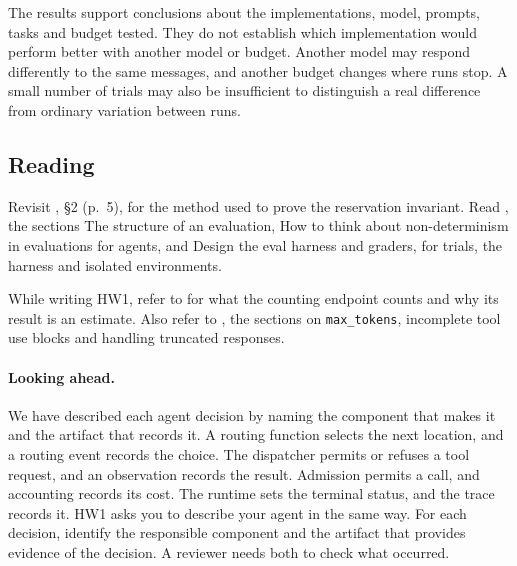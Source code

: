 The results support conclusions about the implementations, model, prompts, tasks and budget
tested. They do not establish which implementation would perform better with another model or
budget. Another model may respond differently to the same messages, and another budget changes
where runs stop. A small number of trials may also be insufficient to distinguish a real
difference from ordinary variation between runs.

\subsection{Reading}

Revisit \citet{mit6042-lec16}, \S2 (p.~5), for the method used to prove the reservation
invariant. Read \citet{anthropic-evals-agents}, the sections The structure of an evaluation, How
to think about non-determinism in evaluations for agents, and Design the eval harness and graders,
for trials, the harness and isolated environments.

While writing HW1, refer to \citet{anthropic-token-counting} for what the counting endpoint counts
and why its result is an estimate. Also refer to \citet{anthropic-stop-reasons}, the sections on
\texttt{max\_tokens}, incomplete tool use blocks and handling truncated responses.

\paragraph{Looking ahead.} We have described each agent decision by naming the component that
makes it and the artifact that records it. A routing function selects the next location, and a
routing event records the choice. The dispatcher permits or refuses a tool request, and an
observation records the result. Admission permits a call, and accounting records its cost. The
runtime sets the terminal status, and the trace records it. HW1 asks you to describe your agent
in the same way. For each decision, identify the responsible component and the artifact that
provides evidence of the decision. A reviewer needs both to check what occurred.
